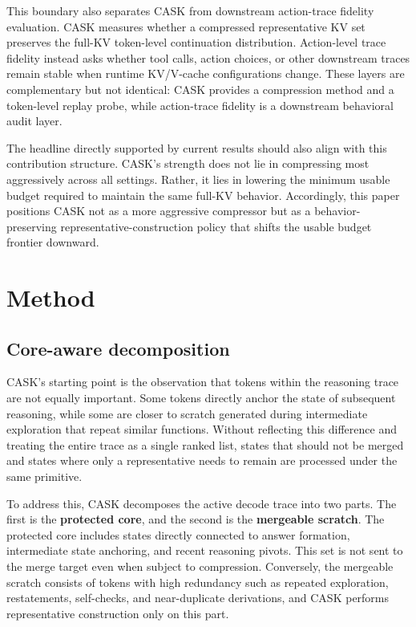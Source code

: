 This boundary also separates CASK from downstream action-trace fidelity evaluation. CASK measures whether a compressed representative KV set preserves the full-KV token-level continuation distribution. Action-level trace fidelity instead asks whether tool calls, action choices, or other downstream traces remain stable when runtime KV/V-cache configurations change. These layers are complementary but not identical: CASK provides a compression method and a token-level replay probe, while action-trace fidelity is a downstream behavioral audit layer.


The headline directly supported by current results should also align with this contribution structure. CASK's strength does not lie in compressing most aggressively across all settings. Rather, it lies in lowering the minimum usable budget required to maintain the same full-KV behavior. Accordingly, this paper positions CASK not as a more aggressive compressor but as a behavior-preserving representative-construction policy that shifts the usable budget frontier downward.


\section{Method}


\subsection{Core-aware decomposition}


CASK's starting point is the observation that tokens within the reasoning trace are not equally important. Some tokens directly anchor the state of subsequent reasoning, while some are closer to scratch generated during intermediate exploration that repeat similar functions. Without reflecting this difference and treating the entire trace as a single ranked list, states that should not be merged and states where only a representative needs to remain are processed under the same primitive.


To address this, CASK decomposes the active decode trace into two parts. The first is the \textbf{protected core}, and the second is the \textbf{mergeable scratch}. The protected core includes states directly connected to answer formation, intermediate state anchoring, and recent reasoning pivots. This set is not sent to the merge target even when subject to compression. Conversely, the mergeable scratch consists of tokens with high redundancy such as repeated exploration, restatements, self-checks, and near-duplicate derivations, and CASK performs representative construction only on this part.



